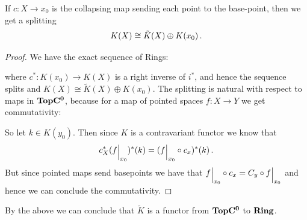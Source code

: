 \begin{corollary}
	If $c:X\to x_0$ is the collapsing map sending each point to the base-point, then we get a splitting 
	\begin{align*}
		K(X)\cong \Tilde{K}(X) \oplus K(x_0) \, .
	\end{align*}  
\end{corollary}
\begin{proof}
	We have the exact sequence of Rings:
	\begin{center}
	\end{center} where $c^*:K(x_0)\to K(X)$ is a right inverse of $i^*$, and hence the sequence splits and $K(X)\cong \tilde{K}(X)\oplus K(x_0)$. The splitting is natural with respect to maps in $\operatorname{\mathbf{TopC^0}}$, because for a map of pointed spaces $f:X\to Y$ we get commutativity:
	\begin{center}
	\end{center}
	So let $k\in K(y_0)$. Then since $K$ is a contravariant functor we know that $$c_X^*({f}\einsch{x_0})^*(k)=({f}\einsch{x_0}\circ c_x)^*(k)\, .$$ But since pointed maps send basepoints we have that ${f}\einsch{x_0}\circ c_x=C_y\circ {f}\einsch{x_0}$ and hence we can conclude the commutativity. 
\end{proof}
\begin{corollary}
	By the above we can conclude that $\tilde{K}$ is a functor from $\operatorname{\mathbf{TopC^0}}$ to $\operatorname{\mathbf{Ring}}$.
\end{corollary}
